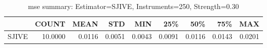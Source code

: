 \begin{table}[ht]
\centering
\caption{mse summary: Estimator=SJIVE, Instruments=250, Strength=0.30}
\begin{tabular}{lrrrrrrrr}
\toprule
 & COUNT & MEAN & STD & MIN & 25\% & 50\% & 75\% & MAX \\
\midrule
SJIVE & 10.0000 & 0.0116 & 0.0051 & 0.0043 & 0.0091 & 0.0116 & 0.0143 & 0.0201 \\
\bottomrule
\end{tabular}
\end{table}
